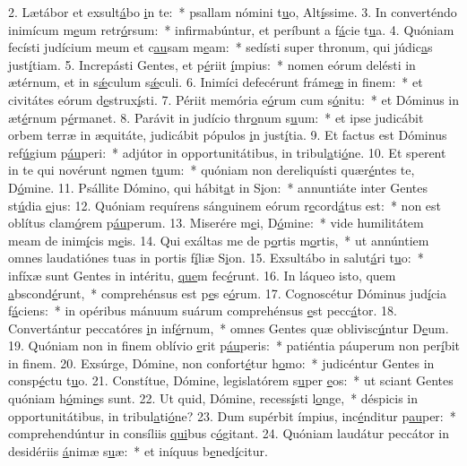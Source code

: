 2. Lætábor et exsult\uline{á}bo \uline{i}n te:~* psallam nómini t\uline{u}o, Alt\uline{í}ssime.
3. In converténdo inimícum m\uline{e}um retr\uline{ó}rsum:~* infirmabúntur, et períbunt a f\uline{á}cie t\uline{u}a.
4. Quóniam fecísti judícium meum et c\uline{au}sam m\uline{e}am:~* sedísti super thronum, qui júdic\uline{a}s just\uline{í}tiam.
5. Increpásti Gentes, et p\uline{é}riit \uline{í}mpius:~* nomen eórum delésti in ætérnum, et in s\uline{ǽ}culum s\uline{ǽ}culi.
6. Inimíci defecérunt fráme\uline{æ} in f\uline{i}nem:~* et civitátes eórum d\uline{e}strux\uline{í}sti.
7. Périit memória e\uline{ó}rum cum s\uline{ó}nitu:~* et Dóminus in æt\uline{é}rnum p\uline{é}rmanet.
8. Parávit in judício thr\uline{o}num s\uline{u}um:~* et ipse judicábit orbem terræ in æquitáte, judicábit pópulos \uline{i}n just\uline{í}tia.
9. Et factus est Dóminus ref\uline{ú}gium p\uline{áu}peri:~* adjútor in opportunitátibus, in tribul\uline{a}ti\uline{ó}ne.
10. Et sperent in te qui novérunt n\uline{o}men t\uline{u}um:~* quóniam non dereliquísti quær\uline{é}ntes te, D\uline{ó}mine.
11. Psállite Dómino, qui hábit\uline{a}t in S\uline{i}on:~* annuntiáte inter Gentes st\uline{ú}dia \uline{e}jus:
12. Quóniam requírens sánguinem eórum r\uline{e}cord\uline{á}tus est:~* non est oblítus clam\uline{ó}rem p\uline{áu}perum.
13. Miserére m\uline{e}i, D\uline{ó}mine:~* vide humilitátem meam de inim\uline{í}cis m\uline{e}is.
14. Qui exáltas me de p\uline{o}rtis m\uline{o}rtis,~* ut annúntiem omnes laudatiónes tuas in portis f\uline{í}liæ S\uline{i}on.
15. Exsultábo in salut\uline{á}ri t\uline{u}o:~* infíxæ sunt Gentes in intéritu, \uline{que}m fec\uline{é}runt.
16. In láqueo isto, quem \uline{a}bscond\uline{é}runt,~* comprehénsus est p\uline{e}s e\uline{ó}rum.
17. Cognoscétur Dóminus jud\uline{í}cia f\uline{á}ciens:~* in opéribus mánuum suárum comprehénsus \uline{e}st pecc\uline{á}tor.
18. Convertántur peccatóres \uline{i}n inf\uline{é}rnum,~* omnes Gentes quæ oblivisc\uline{ú}ntur D\uline{e}um.
19. Quóniam non in finem oblívio \uline{e}rit p\uline{áu}peris:~* patiéntia páuperum non per\uline{í}bit in f\uline{i}nem.
20. Exsúrge, Dómine, non confort\uline{é}tur h\uline{o}mo:~* judicéntur Gentes in consp\uline{é}ctu t\uline{u}o.
21. Constítue, Dómine, legislatórem s\uline{u}per \uline{e}os:~* ut sciant Gentes quóniam h\uline{ó}min\uline{e}s sunt.
22. Ut quid, Dómine, recess\uline{í}sti l\uline{o}nge,~* déspicis in opportunitátibus, in tribul\uline{a}ti\uline{ó}ne?
23. Dum supérbit ímpius, inc\uline{é}nditur p\uline{au}per:~* comprehendúntur in consíliis \uline{qui}bus c\uline{ó}gitant.
24. Quóniam laudátur peccátor in desidériis \uline{á}nimæ s\uline{u}æ:~* et iníquus b\uline{e}ned\uline{í}citur.
